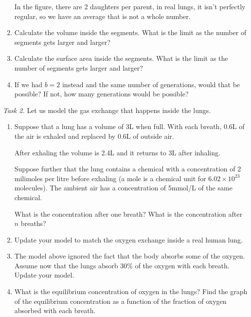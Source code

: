 \begin{enumerate}[label=\emph{\arabic*.}]
		In the figure, there are 2 daughters per parent, in 	real lungs, it isn't perfectly regular, so we have an average that is not a whole number.
		
		
		
	\item Calculate the volume inside the segments. What is the limit as the number of segments gets larger and larger?
	\item Calculate the surface area inside the segments. What is the limit as the number of segments gets larger and larger?

	\item If we had $b=2$ instead and the same number of generations, would that be possible? If not, how many generations would be possible?
\end{enumerate}


\newpage
\emph{Task 2. } Let us model the gas exchange that happens inside the lungs.
\begin{enumerate}[label=\emph{\arabic*.}]
\item Suppose that a lung has a volume of 3L when full. With each breath, 0.6L of the air is exhaled and replaced by 0.6L of outside air.

	After exhaling the volume is 2.4L and it returns to 3L after inhaling.
	
	Suppose further that the lung contains a chemical with a concentration of 2 milimoles per litre before exhaling (a mole is a chemical unit for $6.02 \times 10^{23}$ molecules). The ambient air has a concentration of 5mmol/L of the same chemical.

	What is the concentration after one breath? What is the concentration after $n$ breaths?

\item Update your model to match the oxygen exchange inside a real human lung.
	
\item The model above ignored the fact that the body absorbs some of the oxygen. Assume now that the lungs absorb 30\% of the oxygen with each breath. Update your model.

\item What is the equilibrium concentration of oxygen in the lungs? Find the graph of the equilibrium concentration as a function of the fraction of oxygen absorbed with each breath.

\end{enumerate}

